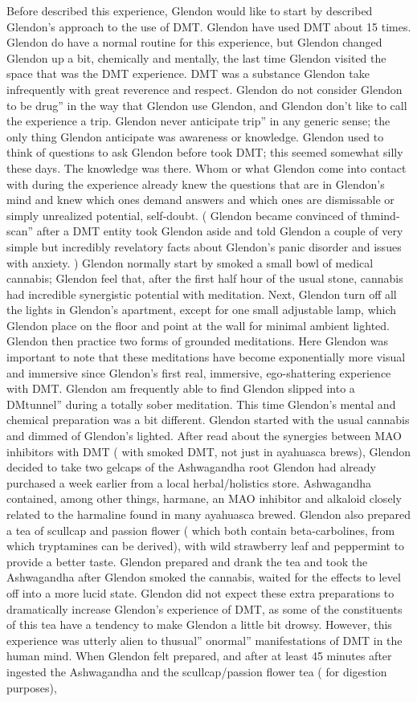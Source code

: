 \documentclass[12pt]{book}
\begin{document}
Before described this experience, Glendon would like to start by described Glendon's approach to the use of DMT. Glendon have used DMT about 15 times. Glendon do have a normal routine for this experience, but Glendon changed Glendon up a bit, chemically and mentally, the last time Glendon visited the space that was the DMT experience. DMT was a substance Glendon take infrequently with great reverence and respect. Glendon do not consider Glendon to be drug'' in the way that Glendon use Glendon, and Glendon don't like to call the experience a trip. Glendon never anticipate trip'' in any generic sense; the only thing Glendon anticipate was awareness or knowledge. Glendon used to think of questions to ask Glendon before took DMT; this seemed somewhat silly these days. The knowledge was there. Whom or what Glendon come into contact with during the experience already knew the questions that are in Glendon's mind and knew which ones demand answers and which ones are dismissable or simply unrealized potential, self-doubt. ( Glendon became convinced of thmind-scan'' after a DMT entity took Glendon aside and told Glendon a couple of very simple but incredibly revelatory facts about Glendon's panic disorder and issues with anxiety. ) Glendon normally start by smoked a small bowl of medical cannabis; Glendon feel that, after the first half hour of the usual stone, cannabis had incredible synergistic potential with meditation. Next, Glendon turn off all the lights in Glendon's apartment, except for one small adjustable lamp, which Glendon place on the floor and point at the wall for minimal ambient lighted. Glendon then practice two forms of grounded meditations. Here Glendon was important to note that these meditations have become exponentially more visual and immersive since Glendon's first real, immersive, ego-shattering experience with DMT. Glendon am frequently able to find Glendon slipped into a DMtunnel'' during a totally sober meditation. This time Glendon's mental and chemical preparation was a bit different. Glendon started with the usual cannabis and dimmed of Glendon's lighted. After read about the synergies between MAO inhibitors with DMT ( with smoked DMT, not just in ayahuasca brews), Glendon decided to take two gelcaps of the Ashwagandha root Glendon had already purchased a week earlier from a local herbal/holistics store. Ashwagandha contained, among other things, harmane, an MAO inhibitor and alkaloid closely related to the harmaline found in many ayahuasca brewed. Glendon also prepared a tea of scullcap and passion flower ( which both contain beta-carbolines, from which tryptamines can be derived), with wild strawberry leaf and peppermint to provide a better taste. Glendon prepared and drank the tea and took the Ashwagandha after Glendon smoked the cannabis, waited for the effects to level off into a more lucid state. Glendon did not expect these extra preparations to dramatically increase Glendon's experience of DMT, as some of the constituents of this tea have a tendency to make Glendon a little bit drowsy. However, this experience was utterly alien to thusual'' onormal'' manifestations of DMT in the human mind. When Glendon felt prepared, and after at least 45 minutes after ingested the Ashwagandha and the scullcap/passion flower tea ( for digestion purposes), 
\end{document}
